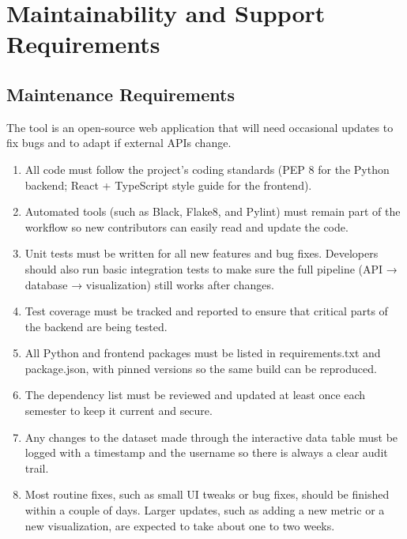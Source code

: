 \documentclass[12pt]{article}
\begin{document}
\section{Maintainability and Support Requirements}
\subsection{Maintenance Requirements}
The tool is an open-source web application that will need occasional updates to fix bugs and to adapt if external APIs change.
\begin{enumerate}[label=MS-MR\arabic*]
\item All code must follow the project’s coding standards (PEP 8 for the Python backend; React + TypeScript style guide for the frontend).
\item Automated tools (such as Black, Flake8, and Pylint) must remain part of the workflow so new contributors can easily read and update the code.
\item Unit tests must be written for all new features and bug fixes. Developers should also run basic integration tests to make sure the full pipeline (API → database → visualization) still works after changes.
\item Test coverage must be tracked and reported to ensure that critical parts of the backend are being tested.
\item All Python and frontend packages must be listed in requirements.txt and package.json, with pinned versions so the same build can be reproduced.
\item The dependency list must be reviewed and updated at least once each semester to keep it current and secure.
\item Any changes to the dataset made through the interactive data table must be logged with a timestamp and the username so there is always a clear audit trail.
\item Most routine fixes, such as small UI tweaks or bug fixes, should be finished within a couple of days. Larger updates, such as adding a new metric or a new visualization, are expected to take about one to two weeks.
\end{enumerate}
\end{document}
